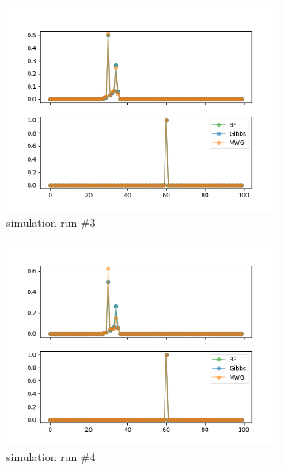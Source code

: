 \begin{figure}[H]
\begin{subfigure}{.3\textwidth}
	    \centering
    	\includegraphics[width=\linewidth]{../../plots/Posterior_post_burnin_M3_N100_NMCMC3_seed2_diffind2.png}
    	\caption{simulation run \#3}
	\end{subfigure}
	\begin{subfigure}{.3\textwidth}
	    \centering
    	\includegraphics[width=\linewidth]{../../plots/Posterior_post_burnin_M3_N100_NMCMC3_seed3_diffind2.png}
    	\caption{simulation run \#4}
	\end{subfigure}
	\begin{subfigure}{.3\textwidth}
	    \centering

\end{subfigure}
\end{figure}
